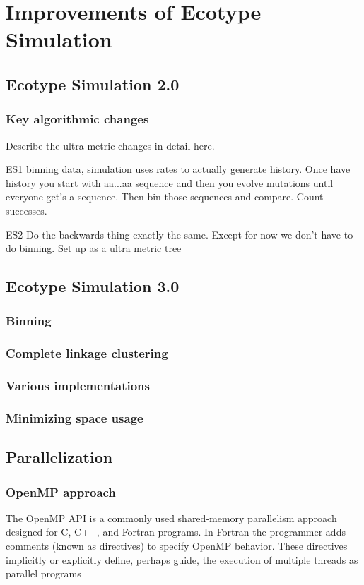 \chapter{Improvements of Ecotype Simulation}
\section{Ecotype Simulation 2.0}
\subsection*{Key algorithmic changes}
Describe the ultra-metric changes in detail here.

ES1 binning data, simulation uses rates to actually generate history. Once have history you start with aa...aa sequence and then you evolve mutations until everyone get's a sequence. Then bin those sequences and compare. Count successes.


ES2 Do the backwards thing exactly the same. Except for now we don't have to do binning. Set up as a ultra metric tree



\section{Ecotype Simulation 3.0}
\subsection{Binning}
\subsection*{Complete linkage clustering}
\subsection*{Various implementations}
\subsection*{Minimizing space usage}
\section{Parallelization}
\subsection*{OpenMP approach} %
The OpenMP API is a commonly used shared-memory parallelism approach designed for C, C++, and Fortran programs.
In Fortran the programmer adds comments (known as directives) to specify OpenMP behavior.
These directives implicitly or explicitly define, perhaps guide, the execution of multiple threads as parallel programs

